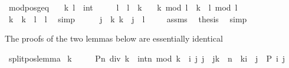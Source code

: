 \begin{isabellebody}
\isamarkupfalse%
%
\endisatagproof
{\isafoldproof}%
%
\isadelimproof
\isanewline
%
\endisadelimproof
\isanewline
{}\isamarkupfalse%
\ mod{\isacharunderscore}{\kern0pt}pos{\isacharunderscore}{\kern0pt}geq{\isacharcolon}{\kern0pt}\isanewline
\ \ \ k\ l\ {\isacharcolon}{\kern0pt}{\isacharcolon}{\kern0pt}\ int\isanewline
\ \ \ {\isachardoublequoteopen}{}\ {\isacharless}{\kern0pt}\ l{\isachardoublequoteclose}\ \ {\isachardoublequoteopen}l\ {\isasymle}\ k{\isachardoublequoteclose}\isanewline
\ \ \ {\isachardoublequoteopen}k\ mod\ l\ {\isacharequal}{\kern0pt}\ {\isacharparenleft}{\kern0pt}k\ {\isacharminus}{\kern0pt}\ l{\isacharparenright}{\kern0pt}\ mod\ l{\isachardoublequoteclose}\isanewline
%
\isadelimproof
%
\endisadelimproof
%
\isatagproof
{}\isamarkupfalse%
\ {\isacharminus}{\kern0pt}\isanewline
\ \ \isamarkupfalse%
\ {\isachardoublequoteopen}k\ {\isacharequal}{\kern0pt}\ {\isacharparenleft}{\kern0pt}k\ {\isacharminus}{\kern0pt}\ l{\isacharparenright}{\kern0pt}\ {\isacharplus}{\kern0pt}\ l{\isachardoublequoteclose}\ \isamarkupfalse%
\ simp\isanewline
\ \ \isamarkupfalse%
\ \isamarkupfalse%
\ j\ \ k{\isacharcolon}{\kern0pt}\ {\isachardoublequoteopen}k\ {\isacharequal}{\kern0pt}\ j\ {\isacharplus}{\kern0pt}\ l{\isachardoublequoteclose}\ \isacommand{{\isachardot}{\kern0pt}{\isachardot}{\kern0pt}}\isamarkupfalse%
\isanewline
\ \ \isamarkupfalse%
\ assms\ \isamarkupfalse%
\ {\isacharquery}{\kern0pt}thesis\ \isamarkupfalse%
\ simp\isanewline
{}\isamarkupfalse%
%
\endisatagproof
{\isafoldproof}%
%
\isadelimproof
%
\endisadelimproof
%
\isadelimdocument
%
\endisadelimdocument
%
\isatagdocument
%
\isamarkuptrue%
%
\endisatagdocument
{\isafolddocument}%
%
\isadelimdocument
%
\endisadelimdocument
%
\begin{isamarkuptext}%
The proofs of the two lemmas below are essentially identical%
\end{isamarkuptext}\isamarkuptrue%
\isamarkupfalse%
\ split{\isacharunderscore}{\kern0pt}pos{\isacharunderscore}{\kern0pt}lemma{\isacharcolon}{\kern0pt}\isanewline
\ {\isachardoublequoteopen}{}{\isacharless}{\kern0pt}k\ {\isasymLongrightarrow}\isanewline
\ \ \ \ P{\isacharparenleft}{\kern0pt}n\ div\ k\ {\isacharcolon}{\kern0pt}{\isacharcolon}{\kern0pt}\ int{\isacharparenright}{\kern0pt}{\isacharparenleft}{\kern0pt}n\ mod\ k{\isacharparenright}{\kern0pt}\ {\isacharequal}{\kern0pt}\ {\isacharparenleft}{\kern0pt}{\isasymforall}i\ j{\isachardot}{\kern0pt}\ {}{\isasymle}j\ {\isasymand}\ j{\isacharless}{\kern0pt}k\ {\isasymand}\ n\ {\isacharequal}{\kern0pt}\ k{\isacharasterisk}{\kern0pt}i\ {\isacharplus}{\kern0pt}\ j\ {\isasymlongrightarrow}\ P\ i\ j{\isacharparenright}{\kern0pt}{\isachardoublequoteclose}\isanewline

\end{isabellebody}

